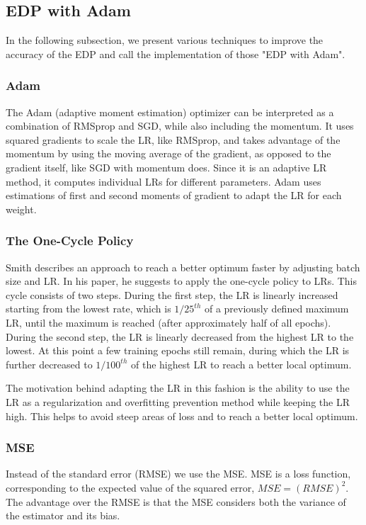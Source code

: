 \subsection{EDP with Adam}\label{sec:adam}
In the following subsection, we present various techniques to improve the accuracy of the \ac{EDP} and call the implementation of those "EDP with Adam".

\subsubsection{Adam}
The Adam (adaptive moment estimation) optimizer \cite{kingma2014adam} can be interpreted as a combination of RMSprop\cite{ruder2016overview} and \ac{SGD}, while also including the momentum. It uses squared gradients to scale the \ac{LR}, like RMSprop, and takes advantage of the momentum by using the moving average of the gradient, as opposed to the gradient itself, like \ac{SGD} with momentum does. Since it is an adaptive \ac{LR} method, it computes individual \ac{LR}s for different parameters. Adam uses estimations of first and second moments of gradient to adapt the \ac{LR} for each weight.

\subsubsection{The One-Cycle Policy}
Smith\cite{smith} describes an approach to reach a better optimum faster by adjusting batch size and \ac{LR}. In his paper, he suggests to apply the one-cycle policy to \ac{LR}s.
This cycle consists of two steps. During the first step, the \ac{LR} is linearly increased starting from the lowest rate, which is $1/25^{th}$ of a previously defined maximum \ac{LR}, until the maximum is reached (after approximately half of all epochs). During the second step, the \ac{LR} is linearly decreased from the highest \ac{LR} to the lowest. At this point a few training epochs still remain, during which the \ac{LR} is further decreased to $1/100^{th}$ of the highest \ac{LR} to reach a better local optimum.

The motivation behind adapting the \ac{LR} in this fashion is the ability to use the \ac{LR} as a regularization and overfitting prevention method while keeping the \ac{LR} high. This helps to avoid steep areas of loss and to reach a better local optimum.

\subsubsection{\ac{MSE}}
Instead of the standard error (RMSE) we use the \ac{MSE}. \ac{MSE} is a loss function, corresponding to the expected value of the squared error, $MSE = (RMSE)^2$. The advantage over the \ac{RMSE} is that the \ac{MSE} considers both the variance of the estimator and its bias. \cite{lehmann2006theory}

